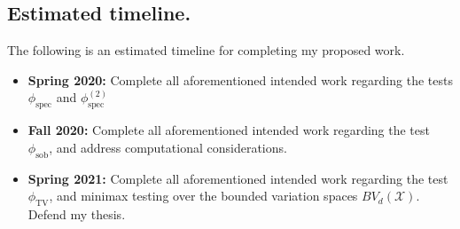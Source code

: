 \documentclass{article}
\newcommand{\1}{\mathbf{1}}
\theoremstyle{alden}
\theoremstyle{aldenthm}
\theoremstyle{definition}
\theoremstyle{remark}
\begin{document}
\subsection{Estimated timeline.}

The following is an estimated timeline for completing my proposed work.
\begin{itemize}
	\item \textbf{Spring 2020:} Complete all aforementioned intended work regarding the tests $\phi_{\mathrm{spec}}$ and $\phi_{\mathrm{spec}}^{(2)}$ 
	\item \textbf{Fall 2020:} Complete all aforementioned intended work regarding the test $\phi_{\mathrm{sob}}$, and address computational considerations.
	\item \textbf{Spring 2021:} Complete all aforementioned intended work regarding the test $\phi_{\mathrm{TV}}$, and minimax testing over the bounded variation spaces $BV_d(\mathcal{X})$. Defend my thesis.
\end{itemize}


\clearpage



\end{document}
